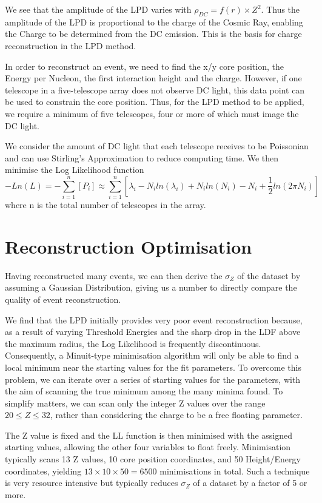 \documentclass{article}
\begin{document}
We see that the amplitude of the LPD varies with $ \rho_{DC}  = f(r) \times Z^{2}$. Thus the amplitude of the LPD is proportional to the charge of the Cosmic Ray, enabling the Charge to be determined from the DC emission. This is the basis for charge reconstruction in the LPD method. 

In order to reconstruct an event, we need to find the x/y core position, the Energy per Nucleon, the first interaction height and the charge. However, if one telescope in a five-telescope array does not observe DC light, this data point can be used to constrain the core position. Thus, for the LPD method to be applied, we require a minimum of five telescopes, four or more of which must image the DC light.

We consider the amount of DC light that each telescope receives to be Poissonian and can use Stirling's Approximation to reduce computing time. We then minimise the Log Likelihood function \[ - Ln(L) = - \sum_{i=1}^{n} [P_{i}] \approx  \sum_{i=1}^{n} [\lambda _{i} - N_{i} ln(\lambda _{i}) + N_{i} ln(N_{i}) - N_{i} + \frac{1}{2} ln(2 \pi N_{i})]  \]
where n is the total number of telescopes in the array.

\section{Reconstruction Optimisation}
Having reconstructed many events, we can then derive the $\sigma_{Z}$ of the dataset by assuming a Gaussian Distribution, giving us a number to directly compare the quality of event reconstruction.

We find that the LPD initially provides very poor event reconstruction because, as a result of varying Threshold Energies and the sharp drop in the LDF above the maximum radius, the Log Likelihood is frequently discontinuous. Consequently, a Minuit-type minimisation algorithm will only be able to find a local minimum near the starting values for the fit parameters. To overcome this problem, we can iterate over a series of starting values for the parameters, with the aim of scanning the true minimum among the many minima found. To simplify matters, we can scan only the integer Z values over the range $ 20 \leq Z \leq 32 $, rather than considering the charge to be a free floating parameter.

The Z value is fixed and the LL function is then minimised with the assigned starting values, allowing the other four variables to float freely. Minimisation typically scans 13 Z values, 10 core position coordinates, and 50 Height/Energy coordinates, yielding $ 13 \times 10 \times 50 = 6500$ minimisations in total. Such a technique is very resource intensive but typically reduces $\sigma_{Z}$ of a dataset by a factor of 5 or more.
\end{document}
